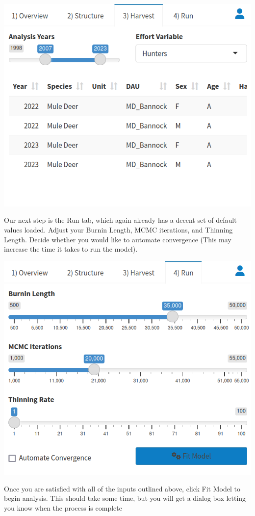 \documentclass[
]{book}
\begin{document}
\includegraphics{./www/ipm_walk5.png}

Our next step is the Run tab, which again already has a decent set of default values loaded. Adjust your Burnin Length, MCMC iterations, and Thinning Length. Decide whether you would like to automate convergence (This may increase the time it takes to run the model).

\includegraphics{./www/ipm_walk6.png}

Once you are satisfied with all of the inputs outlined above, click {Fit Model} to begin analysis. This should take some time, but you will get a dialog box letting you know when the process is complete
\end{document}
